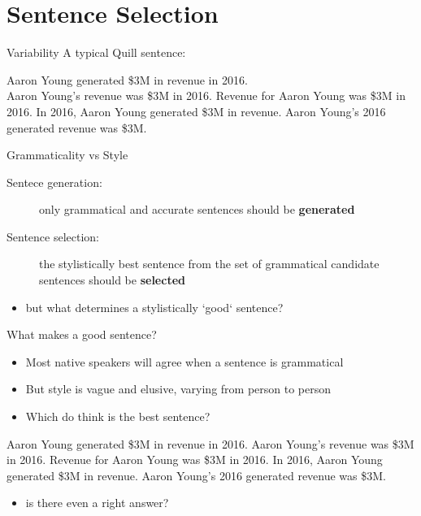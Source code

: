 \documentclass[10pt, compress]{beamer}
\begin{document}
\section{Sentence Selection}
\begin{frame}{Variability}
    A typical Quill sentence:
    \begin{exe}
        \ex \begin{xlist}
            \ex Aaron Young generated \$3M in revenue in 2016. \\ \pause
            \ex Aaron Young's revenue was \$3M in 2016.
            \ex Revenue for Aaron Young was \$3M in 2016.
            \ex In 2016, Aaron Young generated \$3M in revenue.
            \ex Aaron Young's 2016 generated revenue was \$3M.
        \end{xlist}
    \end{exe}
\end{frame}

\begin{frame}{Grammaticality vs Style}
    \begin{description}
        \item[Sentece generation:] only grammatical and accurate sentences should be {\bf generated}
        \item[Sentence selection:] the stylistically best sentence from the set of grammatical candidate sentences should be {\bf selected} \pause
    \end{description}

    \begin{itemize}
        \item but what determines a stylistically `good` sentence?
    \end{itemize}
\end{frame}

\begin{frame}{What makes a good sentence?}
    \begin{itemize}
        \item Most native speakers will agree when a sentence is grammatical
        \item But style is vague and elusive, varying from person to person   \pause
        \item Which do think is the best sentence?
    \end{itemize}

    \begin{exe}
    	\ex \begin{xlist}
	        \ex Aaron Young generated \$3M in revenue in 2016.
	        \ex Aaron Young's revenue was \$3M in 2016.
	        \ex Revenue for Aaron Young was \$3M in 2016.
	        \ex In 2016, Aaron Young generated \$3M in revenue.
	        \ex Aaron Young's 2016 generated revenue was \$3M.
	    \end{xlist}
    \end{exe}

    \pause
    \begin{itemize}
    	\item is there even a right answer?
    \end{itemize}
\end{frame}
\end{document}
